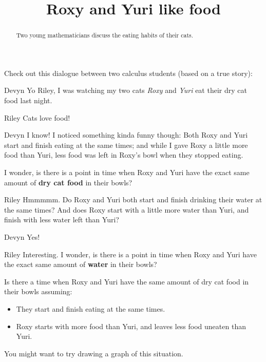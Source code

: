 \documentclass{ximera}
\title[Break-Ground:]{Roxy and Yuri like food}
\begin{document}
\begin{abstract}
Two young mathematicians discuss the eating habits of their cats.
\end{abstract}
\maketitle

Check out this dialogue between two calculus students (based on a true
story):

\begin{dialogue}
\item[Devyn] Yo Riley, I was watching my two cats
  \textit{Roxy} and \textit{Yuri} eat their dry cat food last night.
\item[Riley] Cats love food!
\item[Devyn] I know! I noticed something kinda funny though:
  Both Roxy and Yuri start and finish eating at the same times; and
  while I gave Roxy a little more food than Yuri, less food was left
  in Roxy's bowl when they stopped eating.

  I wonder, is there is a point in time when Roxy and Yuri have the
  exact same amount of \textbf{dry cat food} in their bowls?
\item[Riley] Hmmmmm. Do Roxy and Yuri both start and finish
  drinking their water at the same times?  And does Roxy start with a
  little more water than Yuri, and finish with less water left than
  Yuri?
\item[Devyn] Yes!
\item[Riley] Interesting. I wonder, is there is a point in
  time when Roxy and Yuri have the exact same amount of \textbf{water}
  in their bowls?
\end{dialogue}

\begin{problem}
  Is there a time when Roxy and Yuri have the same amount of dry cat
  food in their bowls assuming:
  \begin{itemize}
  \item They start and finish eating at the same times.
  \item Roxy starts with more food than Yuri, and leaves less food uneaten than Yuri. 
  \end{itemize}
  \begin{hint}
  	You might want to try drawing a graph of this situation.
  \end{hint}
  \begin{multipleChoice}
  \end{multipleChoice}
\end{problem}
\end{document}
